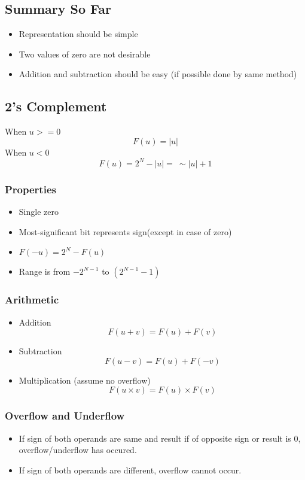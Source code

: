 \documentclass[oneside]{book}
\begin{document}
\subsection{Summary So Far}
\begin{itemize}
	\item Representation should be simple
	\item Two values of zero are not desirable
	\item Addition and subtraction should be easy (if possible done by same method)
\end{itemize}

\subsection{2's Complement}
When \(u >= 0\)
\[
	F(u) = |u|
\]
When \(u < 0\)
\[
	F(u) = 2^N - |u| =\ \sim|u| + 1
\]
\subsubsection{Properties}
\begin{itemize}
	\item Single zero
	\item Most-significant bit represents sign(except in case of zero)
	\item \(F(-u) = 2^N - F(u)\)
	\item Range is from \(-2^{N-1}\) to \((2^{N-1} - 1)\)
\end{itemize}

\subsubsection{Arithmetic}
\begin{itemize}
	\item Addition
	      \[
		      F(u+v) = F(u) + F(v)
	      \]
	\item Subtraction
	      \[
		      F(u-v) = F(u) + F(-v)
	      \]
	\item Multiplication (assume no overflow)
	      \[
		      F(u\times v) = F(u)\times F(v)
	      \]
\end{itemize}
\subsubsection{Overflow and Underflow}
\begin{itemize}
	\item If sign of both operands are same and result if of opposite sign or result is 0, overflow/underflow has occured.
	\item If sign of both operands are different, overflow cannot occur.
\end{itemize}
\end{document}
